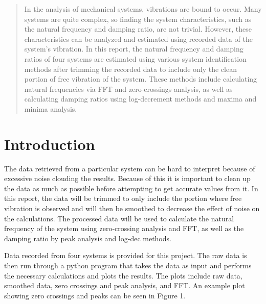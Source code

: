 \documentclass[11pt]{article}
\begin{document}
\newpage
\thispagestyle{empty}
\begin{abstract}
\vspace{-0.2in}
In the analysis of mechanical systems, vibrations are bound to occur. Many systems are quite complex, so finding the system characteristics, such as the natural frequency and damping ratio, are not trivial. However, these characteristics can be analyzed and estimated using recorded data of the system's vibration. In this report, the natural frequency and damping ratios of four systems are estimated using various system identification methods after trimming the recorded data to include only the clean portion of free vibration of the system. These methods include calculating natural frequencies via FFT and zero-crossings analysis, as well as calculating damping ratios using log-decrement methods and maxima and minima analysis.
\end{abstract} 

\newpage

\setcounter{page}{1} 


\section{Introduction}
\label{sec:intro}
\vspace{-0.2in}
The data retrieved from a particular system can be hard to interpret because of excessive noise clouding the results. Because of this it is important to clean up the data as much as possible before attempting to get accurate values from it. In this report, the data will be trimmed to only include the portion where free vibration is observed and will then be smoothed to decrease the effect of noise on the calculations. The processed data will be used to calculate the natural frequency of the system using zero-crossing analysis and FFT, as well as the damping ratio by peak analysis and log-dec methods.
\bigskip

Data recorded from four systems is provided for this project. The raw data is then run through a python program that takes the data as input and performs the necessary calculations and plots the results. The plots include raw data, smoothed data, zero crossings and peak analysis, and FFT. An example plot showing zero crossings and peaks can be seen in Figure 1.
\bigskip
	
\end{document}
